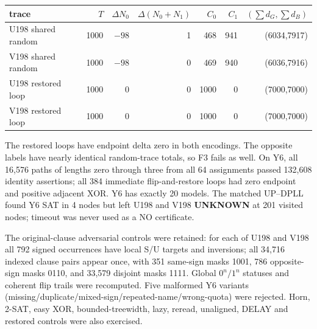 \documentclass[11pt]{article}
\begin{document}
\begin{center}\begin{tabular}{lrrrrrr}\toprule
trace & $T$ & $\Delta N_0$ & $\Delta(N_0+N_1)$ & $C_0$ & $C_1$ & $(\sum d_G,\sum d_B)$\\\midrule
U198 shared random &1000&$-98$&1&468&941&(6034,7917)\\
V198 shared random &1000&$-98$&0&469&940&(6036,7916)\\
U198 restored loop &1000&0&0&1000&0&(7000,7000)\\
V198 restored loop &1000&0&0&1000&0&(7000,7000)\\\bottomrule
\end{tabular}\end{center}

The restored loops have endpoint delta zero in both encodings.  The opposite
labels have nearly identical random-trace totals, so F3 fails as well.  On Y6,
all 16,576 paths of lengths zero through three from all 64 assignments passed
132,608 identity assertions; all 384 immediate flip-and-restore loops had zero
endpoint and positive adjacent XOR.  Y6 has exactly 20 models.  The matched
UP--DPLL found Y6 SAT in 4 nodes but left U198 and V198 \textbf{UNKNOWN} at 201
visited nodes; timeout was never used as a NO certificate.

The original-clause adversarial controls were retained: for each of U198 and
V198 all 792 signed occurrences have local S/U targets and inversions; all
34,716 indexed clause pairs appear once, with 351 same-sign masks 1001, 786
opposite-sign masks 0110, and 33,579 disjoint masks 1111.  Global $0^n/1^n$
statuses and coherent flip trails were recomputed.  Five malformed Y6 variants
(missing/duplicate/mixed-sign/repeated-name/wrong-quota) were rejected.  Horn,
2-SAT, easy XOR, bounded-treewidth, lazy, reread, unaligned, DELAY and restored
controls were also exercised.
\end{document}
